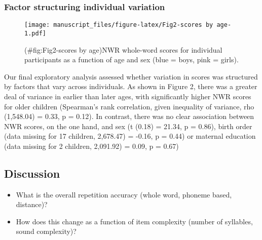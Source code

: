 \documentclass[english,,man,floatsintext]{apa6}
\begin{document}
\hypertarget{factor-structuring-individual-variation}{%
\subsubsection{Factor structuring individual variation}\label{factor-structuring-individual-variation}}

\begin{figure}
\centering
\texttt{[image: manuscript\_files/figure-latex/Fig2-scores by age-1.pdf]}
\caption{(\#fig:Fig2-scores by age)NWR whole-word scores for individual participants as a function of age and sex (blue = boys, pink = girls).}
\end{figure}

Our final exploratory analysis assessed whether variation in scores was structured by factors that vary across individuals. As shown in Figure 2, there was a greater deal of variance in earlier than later ages, with significantly higher NWR scores for older children (Spearman's rank correlation, given inequality of variance, rho (1,548.04) = 0.33, p = 0.12). In contrast, there was no clear association between NWR scores, on the one hand, and sex (t (0.18) = 21.34, p = 0.86), birth order (data missing for 17 children, 2,678.47) = -0.16, p = 0.44) or maternal education (data missing for 2 children, 2,091.92) = 0.09, p = 0.67)

\hypertarget{discussion}{%
\subsection{Discussion}\label{discussion}}

\begin{itemize}
\item
  What is the overall repetition accuracy (whole word, phoneme based, distance)?
\item
  How does this change as a function of item complexity (number of syllables, sound complexity)?
\end{itemize}
\end{document}
